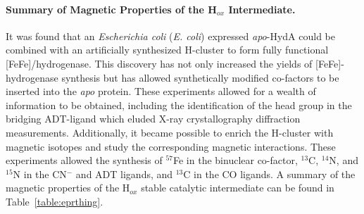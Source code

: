 \paragraph{Summary of Magnetic Properties of the H$_{ox}$ Intermediate.} It was found that an \textit{Escherichia coli} (\textit{E. coli}) expressed \textit{apo}-HydA could be combined with an artificially synthesized H-cluster to form fully functional [FeFe]\-/hydrogenase. \cite{EsselbornArtificial,BirrellArtificial} This discovery has not only increased the yields of [FeFe]-hydrogenase synthesis but has allowed synthetically modified co-factors to be inserted into the \textit{apo} protein. These experiments allowed for a wealth of information to be obtained, including the identification of the head group in the bridging ADT-ligand which eluded X-ray crystallography diffraction measurements. \cite{AdamskaBridgingAmine} Additionally, it became possible to enrich the H-cluster with magnetic isotopes and study the corresponding magnetic interactions. These experiments allowed the synthesis of $^{57}$Fe in the binuclear co-factor, $^{13}$C, $^{14}$N, and $^{15}$N in the CN$^-$ and ADT ligands, and $^{13}$C in the CO ligands. A summary of the magnetic properties of the H$_{ox}$ stable catalytic intermediate can be found in Table~\ref{table:eprthing}. 
